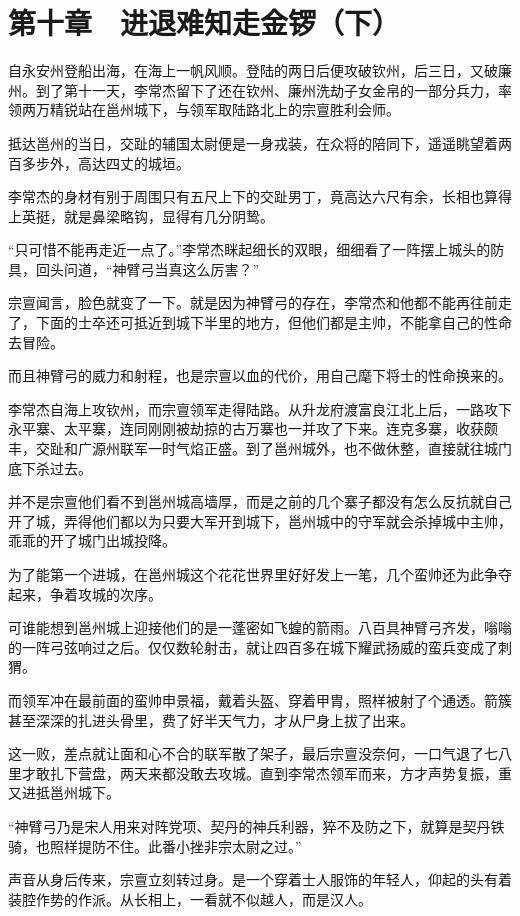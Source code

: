 \section{第十章　进退难知走金锣（下）}

自永安州登船出海，在海上一帆风顺。登陆的两日后便攻破钦州，后三日，又破廉州。到了第十一天，李常杰留下了还在钦州、廉州洗劫子女金帛的一部分兵力，率领两万精锐站在邕州城下，与领军取陆路北上的宗亶胜利会师。

抵达邕州的当日，交趾的辅国太尉便是一身戎装，在众将的陪同下，遥遥眺望着两百多步外，高达四丈的城垣。

李常杰的身材有别于周围只有五尺上下的交趾男丁，竟高达六尺有余，长相也算得上英挺，就是鼻梁略钩，显得有几分阴鸷。

“只可惜不能再走近一点了。”李常杰眯起细长的双眼，细细看了一阵摆上城头的防具，回头问道，“神臂弓当真这么厉害？”

宗亶闻言，脸色就变了一下。就是因为神臂弓的存在，李常杰和他都不能再往前走了，下面的士卒还可抵近到城下半里的地方，但他们都是主帅，不能拿自己的性命去冒险。

而且神臂弓的威力和射程，也是宗亶以血的代价，用自己麾下将士的性命换来的。

李常杰自海上攻钦州，而宗亶领军走得陆路。从升龙府渡富良江北上后，一路攻下永平寨、太平寨，连同刚刚被劫掠的古万寨也一并攻了下来。连克多寨，收获颇丰，交趾和广源州联军一时气焰正盛。到了邕州城外，也不做休整，直接就往城门底下杀过去。

并不是宗亶他们看不到邕州城高墙厚，而是之前的几个寨子都没有怎么反抗就自己开了城，弄得他们都以为只要大军开到城下，邕州城中的守军就会杀掉城中主帅，乖乖的开了城门出城投降。

为了能第一个进城，在邕州城这个花花世界里好好发上一笔，几个蛮帅还为此争夺起来，争着攻城的次序。

可谁能想到邕州城上迎接他们的是一蓬密如飞蝗的箭雨。八百具神臂弓齐发，嗡嗡的一阵弓弦响过之后。仅仅数轮射击，就让四百多在城下耀武扬威的蛮兵变成了刺猬。

而领军冲在最前面的蛮帅申景福，戴着头盔、穿着甲胄，照样被射了个通透。箭簇甚至深深的扎进头骨里，费了好半天气力，才从尸身上拔了出来。

这一败，差点就让面和心不合的联军散了架子，最后宗亶没奈何，一口气退了七八里才敢扎下营盘，两天来都没敢去攻城。直到李常杰领军而来，方才声势复振，重又进抵邕州城下。

“神臂弓乃是宋人用来对阵党项、契丹的神兵利器，猝不及防之下，就算是契丹铁骑，也照样提防不住。此番小挫非宗太尉之过。”

声音从身后传来，宗亶立刻转过身。是一个穿着士人服饰的年轻人，仰起的头有着装腔作势的作派。从长相上，一看就不似越人，而是汉人。

